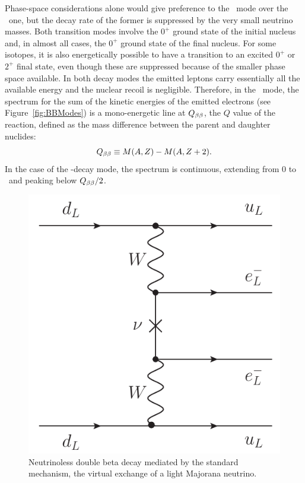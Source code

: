 \documentclass{PoS}
\begin{document}
Phase-space considerations alone would give preference to the \bbonu\ mode over the \bbtnu\ one, but the decay rate of the former is suppressed by the very small neutrino masses. Both transition modes involve the $0^{+}$ ground state of the initial nucleus and, in almost all cases, the $0^{+}$ ground state of the final nucleus. For some isotopes, it is also energetically possible to have a transition to an excited $0^{+}$ or $2^{+}$ final state, even though these are suppressed because of the smaller phase space available. In both decay modes the emitted leptons carry essentially all the available energy and the nuclear recoil is negligible. Therefore, in the \bbonu\ mode, the spectrum for the sum of the kinetic energies of the emitted electrons (see Figure~\ref{fig:BBModes}) is a mono-energetic line at $Q_{\beta\beta}$, the $Q$ value of the reaction, defined as the mass difference between the parent and daughter nuclides:
\begin{equation}
Q_{\beta\beta} \equiv M(A, Z) - M(A, Z+2).
\end{equation}
In the case of the \bbtnu-decay mode, the spectrum is continuous, extending from 0 to \Qbb\ and peaking below $Q_{\beta\beta}/2$.

\begin{figure}
\centering
\includegraphics[scale=0.625]{img/LightNuExchange.pdf}
\caption{Neutrinoless double beta decay mediated by the standard mechanism, the virtual exchange of a light Majorana neutrino.} \label{fig:LightMajoranaNuExchange}
\end{figure}
\end{document}
